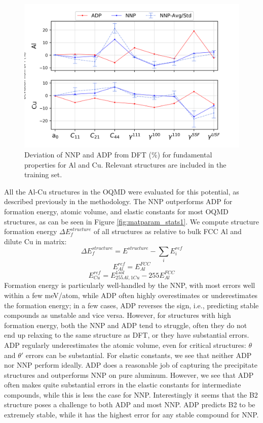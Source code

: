 \documentclass{article}
\begin{document}
\begin{figure}[H]%
\centering%
\includegraphics[width=1\textwidth,center]{./figures/matparam_purestats.png}%
\caption{Deviation of NNP and ADP from DFT (\%) for fundamental properties for Al and Cu. 
Relevant structures are included in the training set. }%
\label{fig:matparam_purestats}
\end{figure}
All the Al-Cu structures in the OQMD were evaluated for this potential, as described previously in the methodology.
The NNP outperforms ADP for formation energy, atomic volume, and elastic constants for most OQMD structures, as can be seen in Figure \ref{fig:matparam_stats1}.
We compute structure formation energy $\Delta E^{structure}_f$ of all structures as relative to bulk FCC Al and dilute Cu in matrix:
\begin{equation} \label{eqn:formE_structure}
\Delta E^{structure}_f = E^{structure} - \sum_i E^{ref}_i
\end{equation}
\begin{equation} \label{eqn:formRef_Al}
E^{ref}_{Al} = E^{FCC}_{Al}
\end{equation}
\begin{equation} \label{eqn:formRef_Cu}
E^{ref}_{Cu} = E^{1sol}_{255Al,1Cu} - 255E^{FCC}_{Al}
\end{equation}
Formation energy is particularly well-handled by the NNP, with most errors well within a few meV/atom, while ADP often highly overestimates or underestimates the formation energy;
in a few cases, ADP reverses the sign, i.e., predicting stable compounds as unstable and vice versa.
However, for structures with high formation energy, both the NNP and ADP tend to struggle, often they do not end up relaxing to the same structure as DFT, or they have substantial errors.
ADP regularly underestimates the atomic volume, even for critical structures: $\theta$ and $\theta'$ errors can be substantial.
For elastic constants, we see that neither ADP nor NNP perform ideally.
ADP does a reasonable job of capturing the precipitate structures and outperforms NNP on pure aluminum.
However, we see that ADP often makes quite substantial errors in the elastic constants for intermediate compounds, while this is less the case for NNP. Interestingly it seems that the B2 structure poses a challenge to both ADP and most NNP.
ADP predicts B2 to be extremely stable, while it has the highest error for any stable compound for NNP. 
\end{document}
